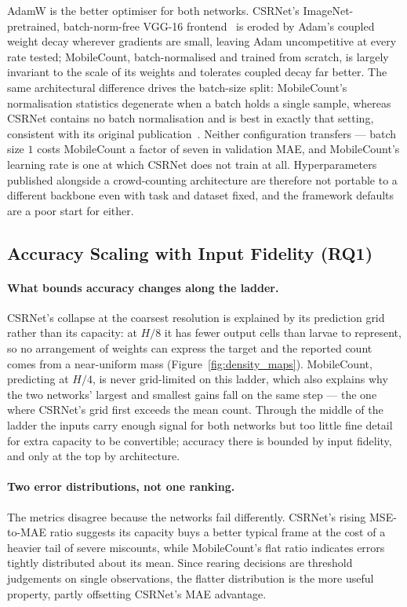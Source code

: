\documentclass[conference]{IEEEtran}
\begin{document}
AdamW is the better optimiser for both networks. CSRNet's ImageNet-pretrained,
batch-norm-free VGG-16 frontend~\cite{li2018csrnet} is eroded by Adam's coupled
weight decay wherever gradients are small, leaving Adam uncompetitive at every
rate tested; MobileCount, batch-normalised and trained from scratch, is largely
invariant to the scale of its weights and tolerates coupled decay far better.
The same architectural difference drives the batch-size split: MobileCount's
normalisation statistics degenerate when a batch holds a single sample, whereas
CSRNet contains no batch normalisation and is best in exactly that setting,
consistent with its original publication~\cite{li2018csrnet}. Neither
configuration transfers --- batch size $1$ costs MobileCount a factor of seven
in validation MAE, and MobileCount's learning rate is one at which CSRNet does
not train at all. Hyperparameters published alongside a crowd-counting
architecture are therefore not portable to a different backbone even with task
and dataset fixed, and the framework defaults are a poor start for either.

\subsection{Accuracy Scaling with Input Fidelity (RQ1)}
\label{subsec:disc_accuracy}

\paragraph{What bounds accuracy changes along the ladder.}
CSRNet's collapse at the coarsest resolution is explained by its prediction grid
rather than its capacity: at $H/8$ it has fewer output cells than larvae to
represent, so no arrangement of weights can express the target and the reported
count comes from a near-uniform mass (Figure~\ref{fig:density_maps}).
MobileCount, predicting at $H/4$, is never grid-limited on this ladder, which
also explains why the two networks' largest and smallest gains fall on the same
step --- the one where CSRNet's grid first exceeds the mean count. Through the
middle of the ladder the inputs carry enough signal for both networks but too
little fine detail for extra capacity to be convertible; accuracy there is
bounded by input fidelity, and only at the top by architecture.

\paragraph{Two error distributions, not one ranking.}
The metrics disagree because the networks fail differently. CSRNet's rising
MSE-to-MAE ratio suggests its capacity buys a better typical frame at the cost
of a heavier tail of severe miscounts, while MobileCount's flat ratio indicates
errors tightly distributed about its mean. Since rearing decisions are threshold
judgements on single observations, the flatter distribution is the more useful
property, partly offsetting CSRNet's MAE advantage.
\end{document}
